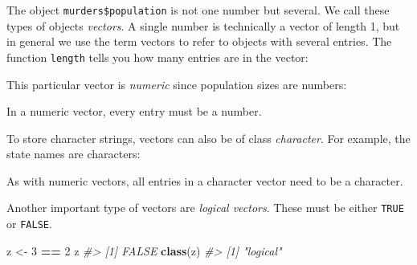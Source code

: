 \documentclass[
]{krantz}
\newenvironment{Shaded}{\begin{snugshade}}{\end{snugshade}}
\newcommand{\CommentTok}[1]{\textcolor[rgb]{0.37,0.37,0.37}{\textit{#1}}}
\newcommand{\DecValTok}[1]{\textcolor[rgb]{0.06,0.06,0.06}{#1}}
\newcommand{\KeywordTok}[1]{\textcolor[rgb]{0.27,0.27,0.27}{\textbf{#1}}}
\newcommand{\NormalTok}[1]{#1}
\newcommand{\OperatorTok}[1]{\textcolor[rgb]{0.43,0.43,0.43}{\textbf{#1}}}
\newcommand{\StringTok}[1]{\textcolor[rgb]{0.5,0.5,0.5}{#1}}
\begin{document}
The object \texttt{murders\$population} is not one number but several. We call these types of objects \emph{vectors}. A single number is technically a vector of length 1, but in general we use the term vectors to refer to objects with several entries. The function \texttt{length} tells you how many entries are in the vector:

\begin{Shaded}
\end{Shaded}

This particular vector is \emph{numeric} since population sizes are numbers:

\begin{Shaded}
\end{Shaded}

In a numeric vector, every entry must be a number.

To store character strings, vectors can also be of class \emph{character}. For example, the state names are characters:

\begin{Shaded}
\end{Shaded}

As with numeric vectors, all entries in a character vector need to be a character.

Another important type of vectors are \emph{logical vectors}. These must be either \texttt{TRUE} or \texttt{FALSE}.

\begin{Shaded}
\begin{Highlighting}[]
\NormalTok{z <-}\StringTok{ }\DecValTok{3} \OperatorTok{==}\StringTok{ }\DecValTok{2}
\NormalTok{z}
\CommentTok{#> [1] FALSE}
\KeywordTok{class}\NormalTok{(z)}
\CommentTok{#> [1] "logical"}
\end{Highlighting}
\end{Shaded}
\end{document}
